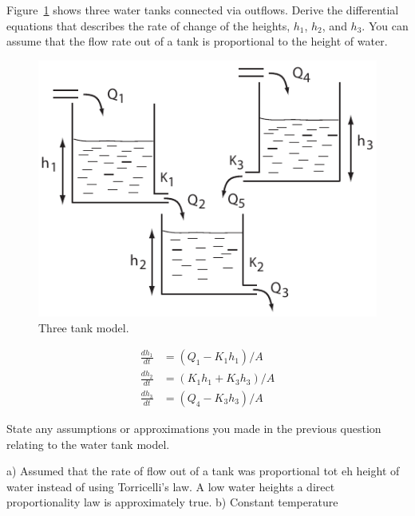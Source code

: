 \documentclass[12pt]{article}
\begin{document}
\begin{question}
Figure~\ref{fig:ThreeTank} shows three water tanks connected via outflows. Derive the differential equations that describes the rate of change of the heights, $h_1$, $h_2$, and $h_3$. You can assume that the flow rate out of a tank is proportional to the height of water.

\begin{figure}[htb]
\begin{center}
  \includegraphics[scale = 1]{ThreeTank}
  \caption{Three tank model.}
  \label{fig:ThreeTank}
\end{center}
\end{figure}
\end{question}
\begin{solution}
\begin{align*}
\frac{dh_1}{dt} &= (Q_1 - K_1 h_1)/A \\
\frac{dh_2}{dt} &= (K_1 h_1 + K_3 h_3)/A \\
\frac{dh_3}{dt} &= (Q_4 - K_3 h_3)/A
\end{align*}
\end{solution}



\begin{question}
State any assumptions or approximations you made in the previous question relating to the water tank model.
\end{question}
\begin{solution}
a) Assumed that the rate of flow out of a tank was proportional tot eh height of water instead of using Torricelli's law. A low water heights a direct proportionality law is approximately true. b) Constant temperature
\end{solution}
\end{document}
